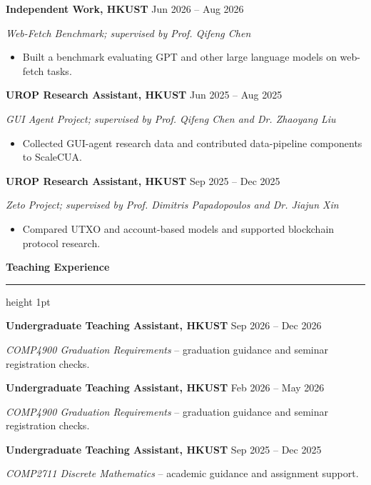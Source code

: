 \documentclass[a4paper,10pt]{article}
\newcommand{\cvsection}[1]{%
  \par\Needspace{3\baselineskip}\vspace{4pt}%
  {\color{cvblue}\textbf{\normalsize #1}}%
  \par\vspace{2pt}%
  {\color{cvblue}\hrule height 1pt}%
  \vspace{2pt}%
}
\newcommand{\cvitem}[1]{\item #1}
\begin{document}
\vspace{2pt}
\textbf{Independent Work, HKUST}
\hfill {\color{cvblue}Jun 2026 -- Aug 2026}\par
\textit{Web-Fetch Benchmark; supervised by Prof. Qifeng Chen}\par
\begin{itemize}[leftmargin=1.3em, topsep=1pt, itemsep=1pt, parsep=0pt]
  \cvitem{Built a benchmark evaluating GPT and other large language models on web-fetch tasks.}
\end{itemize}

\vspace{2pt}
\textbf{UROP Research Assistant, HKUST}
\hfill {\color{cvblue}Jun 2025 -- Aug 2025}\par
\textit{GUI Agent Project; supervised by Prof. Qifeng Chen and Dr. Zhaoyang Liu}\par
\begin{itemize}[leftmargin=1.3em, topsep=1pt, itemsep=1pt, parsep=0pt]
  \cvitem{Collected GUI-agent research data and contributed data-pipeline components to ScaleCUA.}
\end{itemize}

\vspace{2pt}
\textbf{UROP Research Assistant, HKUST}
\hfill {\color{cvblue}Sep 2025 -- Dec 2025}\par
\textit{Zeto Project; supervised by Prof. Dimitris Papadopoulos and Dr. Jiajun Xin}\par
\begin{itemize}[leftmargin=1.3em, topsep=1pt, itemsep=1pt, parsep=0pt]
  \cvitem{Compared UTXO and account-based models and supported blockchain protocol research.}
\end{itemize}

\cvsection{Teaching Experience}
\textbf{Undergraduate Teaching Assistant, HKUST}
\hfill {\color{cvblue}Sep 2026 -- Dec 2026}\par
\textit{COMP4900 Graduation Requirements} -- graduation guidance and seminar registration checks.\par

\vspace{2pt}
\textbf{Undergraduate Teaching Assistant, HKUST}
\hfill {\color{cvblue}Feb 2026 -- May 2026}\par
\textit{COMP4900 Graduation Requirements} -- graduation guidance and seminar registration checks.\par

\vspace{2pt}
\textbf{Undergraduate Teaching Assistant, HKUST}
\hfill {\color{cvblue}Sep 2025 -- Dec 2025}\par
\textit{COMP2711 Discrete Mathematics} -- academic guidance and assignment support.\par
\end{document}
